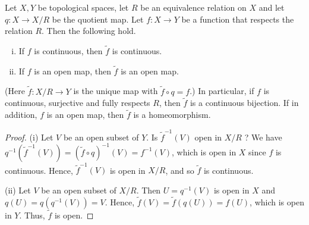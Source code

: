 \documentclass[a4paper,11pt]{article}
\begin{document}
\begin{proposition}\label{prop:4.10}
    Let $X, Y$ be topological spaces, let $R$ be an equivalence relation on $X$ and let $q: X \rightarrow X / R$ be the quotient map. Let $f: X \rightarrow Y$ be a function that respects the relation $R$. Then the following hold.
    \begin{enumerate}[(i)]
        \item If $f$ is continuous, then $\tilde{f}$ is continuous.

        \item If $f$ is an open map, then $\tilde{f}$ is an open map.
    \end{enumerate}
    (Here $\tilde{f}: X / R \rightarrow Y$ is the unique map with $\tilde{f} \circ q=f$.) In particular, if $f$ is continuous, surjective and fully respects $R$, then $\tilde{f}$ is a continuous bijection. If in addition, $f$ is an open map, then $\tilde{f}$ is a homeomorphism.
\end{proposition}
\begin{proof}
    (i) Let $V$ be an open subset of $Y$. Is $\tilde{f}^{-1}(V)$ open in $X / R$ ? We have $q^{-1}\left(\tilde{f}^{-1}(V)\right)=(\tilde{f} \circ q)^{-1}(V)=f^{-1}(V)$, which is open in $X$ since $f$ is continuous. Hence, $\tilde{f}^{-1}(V)$ is open in $X / R$, and so $\tilde{f}$ is continuous.

    (ii) Let $V$ be an open subset of $X / R$. Then $U=q^{-1}(V)$ is open in $X$ and $q(U)=q\left(q^{-1}(V)\right)=V$. Hence, $\tilde{f}(V)=\tilde{f}(q(U))=f(U)$, which is open in $Y$. Thus, $\tilde{f}$ is open.
\end{proof}
\end{document}
